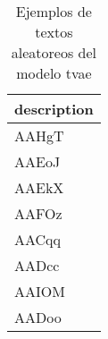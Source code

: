 \begin{table}[H]
\centering
\fontsize{8}{14}\selectfont
\caption{Ejemplos de textos aleatoreos del modelo tvae}
\label{table-sample10-economicos-a-1-tvae-text}
\begin{tabular}{|m{45em}|}
\hline
\rowcolor[gray]{0.8}
description \\
\hline AAHgT \\
\hline AAEoJ \\
\hline AAEkX \\
\hline AAFOz \\
\hline AACqq \\
\hline AADcc \\
\hline AAIOM \\
\hline AADoo \\
\hline
\end{tabular}
\end{table}

